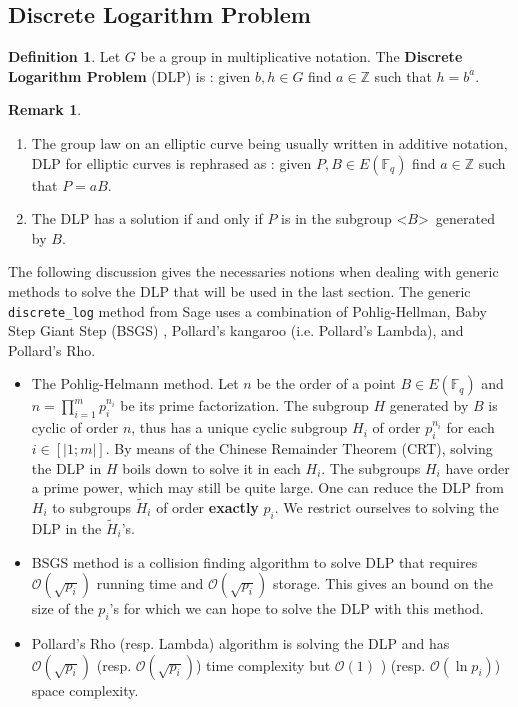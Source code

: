 \documentclass[10pt]{article}
\theoremstyle{definition}
\newtheorem{definition}{Definition}
\newtheorem{remark}{Remark}
\newcommand{\F}{\mathbb{F}}
\newcommand{\Z}{\mathbb{Z}}
\begin{document}
\subsection{Discrete Logarithm Problem}

\begin{definition}
Let $G$ be a group in multiplicative notation.
The \textbf{Discrete Logarithm Problem} (DLP) is : given $b,h \in G$ find $a \in \Z$ such that $h = b^a$.
\end{definition}

\noindent \begin{remark}
\begin{enumerate}
\item The group law on an elliptic curve being usually written in additive notation, DLP for elliptic curves is rephrased as : given $P,B \in E(\F_q)$ find $a \in \Z$ such that $P = aB$.
\item The DLP has a solution if and only if $P$ is in the subgroup \textless$B$\textgreater~generated by $B$.
\end{enumerate}
\end{remark}

The following discussion gives the necessaries notions when dealing with generic methods to solve the DLP that will be used in the last section.
The generic \verb|discrete_log| method from Sage uses a combination of Pohlig-Hellman, Baby Step Giant Step (BSGS) , Pollard’s kangaroo (i.e. Pollard's Lambda), and Pollard’s Rho. 

\begin{itemize}
\item The Pohlig-Helmann method.
Let $n$ be the order of a point $B \in E(\F_q)$ and  $n = \prod_{i = 1}^m p_i^{n_i}$ be its prime factorization.
The subgroup $H$ generated by $B$ is cyclic of order $n$, thus has a unique cyclic subgroup $H_i$ of order $p_i^{n_i}$ for each $i \in [| 1; m|]$.
By means of the Chinese Remainder Theorem (CRT), solving the DLP in $H$ boils down to solve it in each $H_i$. 
The subgroups $H_i$ have order a prime power, which may still be quite large. 
One can reduce the DLP from $H_i$ to subgroups $\tilde{H}_i$ of order \textbf{exactly} $p_i$.
We restrict ourselves to solving the DLP in the $\tilde{H}_i$'s.
\item BSGS method is a collision finding algorithm to solve DLP that requires $\mathcal{O}(\sqrt{p_i})$ running time and $\mathcal{O}(\sqrt{p_i})$ storage.
This gives an bound on the size of the $p_i$'s for which we can hope to solve the DLP with this method.
\item Pollard's Rho (resp. Lambda) algorithm is solving the DLP and has $\mathcal{O}(\sqrt{p_i})$ (resp. $\mathcal{O}(\sqrt{p_i})$) time complexity but $\mathcal{O}(1)$ ) (resp. $\mathcal{O}(\ln{p_i})$) space complexity.
\end{itemize}
\end{document}
